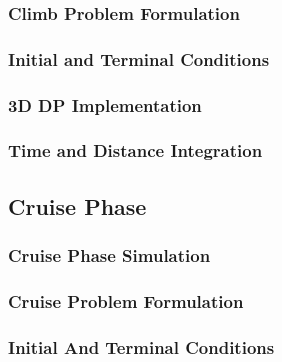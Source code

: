 \documentclass[12pt, a4paper]{report}
\begin{document}
\subsubsection{Climb Problem Formulation}


\subsubsection{Initial and Terminal Conditions}


\subsubsection{3D DP Implementation}


\subsubsection{Time and Distance Integration}

 
\subsection{Cruise Phase}
\label{subsec:cruise_phase}
\subsubsection{Cruise Phase Simulation}


\subsubsection{Cruise Problem Formulation}


\subsubsection{Initial And Terminal Conditions}

\end{document}
